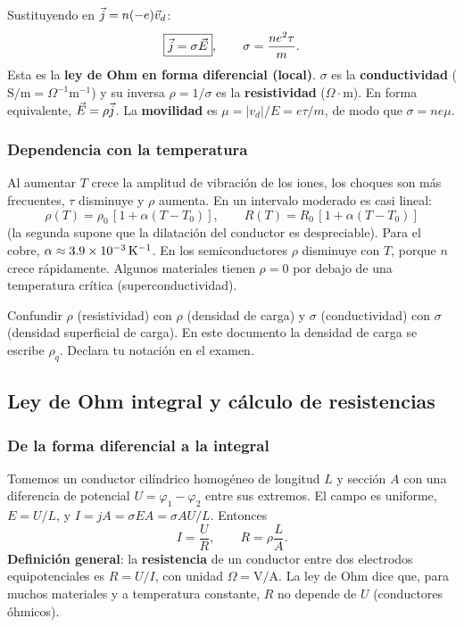 \documentclass[11pt]{article}
\begin{document}
Sustituyendo en $\vec{j}=n(-e)\vec v_d$:
\[
\boxed{\vec{j}=\sigma\vec{E}},\qquad \sigma=\frac{ne^2\tau}{m}.
\]
Esta es la \textbf{ley de Ohm en forma diferencial (local)}. $\sigma$ es la \textbf{conductividad} ($\mathrm{S/m}=\Omega^{-1}\mathrm{m^{-1}}$) y su inversa $\rho=1/\sigma$ es la \textbf{resistividad} ($\Omega\cdot\mathrm{m}$). En forma equivalente, $\vec{E}=\rho\vec{j}$. La \textbf{movilidad} es $\mu=|v_d|/E=e\tau/m$, de modo que $\sigma=ne\mu$.

\subsubsection*{Dependencia con la temperatura}
Al aumentar $T$ crece la amplitud de vibración de los iones, los choques son más frecuentes, $\tau$ disminuye y $\rho$ aumenta. En un intervalo moderado es casi lineal:
\[
\rho(T)=\rho_0\,[1+\alpha(T-T_0)],\qquad R(T)=R_0\,[1+\alpha(T-T_0)]
\]
(la segunda supone que la dilatación del conductor es despreciable). Para el cobre, $\alpha\approx3.9\times10^{-3}\,\mathrm{K^{-1}}$. En los semiconductores $\rho$ disminuye con $T$, porque $n$ crece rápidamente. Algunos materiales tienen $\rho=0$ por debajo de una temperatura crítica (superconductividad).

\begin{alerta}
Confundir $\rho$ (resistividad) con $\rho$ (densidad de carga) y $\sigma$ (conductividad) con $\sigma$ (densidad superficial de carga). En este documento la densidad de carga se escribe $\rho_q$. Declara tu notación en el examen.
\end{alerta}

\subsection{Ley de Ohm integral y cálculo de resistencias}
\subsubsection*{De la forma diferencial a la integral}
Tomemos un conductor cilíndrico homogéneo de longitud $L$ y sección $A$ con una diferencia de potencial $U=\varphi_1-\varphi_2$ entre sus extremos. El campo es uniforme, $E=U/L$, y $I=jA=\sigma EA=\sigma AU/L$. Entonces
\[
\boxed{I=\frac{U}{R}},\qquad \boxed{R=\rho\frac{L}{A}}.
\]
\textbf{Definición general}: la \textbf{resistencia} de un conductor entre dos electrodos equipotenciales es $R=U/I$, con unidad $\Omega=\mathrm{V/A}$. La ley de Ohm dice que, para muchos materiales y a temperatura constante, $R$ no depende de $U$ (conductores óhmicos).
\end{document}

